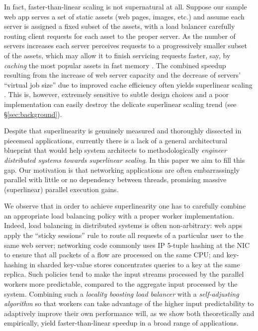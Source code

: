 In fact, faster-than-linear scaling is not supernatural at all. Suppose our sample web app serves a set of static assets (web pages, images, etc.) and assume each server is assigned a fixed subset of the assets, with a load balancer carefully routing client requests for each asset to the proper server. As the number of servers increases each server perceives requests to a progressively smaller subset of the assets, which may allow it to finish servicing requests faster, say, by \emph{caching} the most popular assets in fast memory \cite{10.5555/1012889.1012894, 271208}. The combined speedup resulting from the increase of web server capacity and the decrease of servers' ``virtual job size'' due to improved cache efficiency often yields superlinear scaling \cite{556383, dobb-1, dobb-2, 7733347, 80148, wikipedia, 10.1145/42411.42415, 556383, scalability-analyzed, icsoft20}. This is, however, extremely sensitive to subtle design choices and a poor implementation can easily destroy the delicate superlinear scaling trend (see \S\ref{sec:background}).

Despite that superlinearity is genuinely measured \cite{scalability-analyzed, sdn-analytitcs, 6483679, 10.1007/978-3-319-77610-1, 10.1145/3627703.3629574, icsoft20} and thoroughly dissected \cite{dobb-1, dobb-2, 10.1145/2773212.2789974, 556383, 7733347, 80148} in piecemeal applications, currently there is a lack of a general architectural blueprint that would help system architects to methodologically \emph{engineer distributed systems towards superlinear scaling}. In this paper we aim to fill this gap. Our motivation is that networking applications are often embarrassingly parallel with little or no dependency between threads, promising massive (superlinear) parallel execution gains.

We observe that in order to achieve superlinearity one has to carefully combine an appropriate load balancing policy with a proper worker implementation. Indeed, load balancing in distributed systems is often non-arbitrary: web apps apply the ``sticky sessions'' rule to route all requests of a particular user to the same web server; %
networking code commonly uses IP 5-tuple hashing at the NIC to ensure that all packets of a flow are processed on the same CPU; %
and key-hashing in sharded key-value stores concentrates queries to a key at the same replica. Such policies tend to make the input streams processed by the parallel workers more predictable, compared to the aggregate input processed by the system. Combining such a \emph{locality boosting load balancer} with a \emph{self-adjusting algorithm} so that workers can take advantage of the higher input predictability to adaptively improve their own performance will, as we show both theoretically and empirically, yield faster-than-linear speedup in a broad range of applications.

